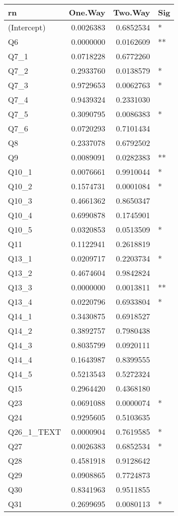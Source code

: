 \documentclass[12pt,]{article}
\begin{document}
\begin{tabular}{l|r|r|l}
\hline
rn & One.Way & Two.Way & Sig\\
\hline
(Intercept) & 0.0026383 & 0.6852534 & *\\
\hline
Q6 & 0.0000000 & 0.0162609 & **\\
\hline
Q7\_1 & 0.0718228 & 0.6772260 & \\
\hline
Q7\_2 & 0.2933760 & 0.0138579 & *\\
\hline
Q7\_3 & 0.9729653 & 0.0062763 & *\\
\hline
Q7\_4 & 0.9439324 & 0.2331030 & \\
\hline
Q7\_5 & 0.3090795 & 0.0086383 & *\\
\hline
Q7\_6 & 0.0720293 & 0.7101434 & \\
\hline
Q8 & 0.2337078 & 0.6792502 & \\
\hline
Q9 & 0.0089091 & 0.0282383 & **\\
\hline
Q10\_1 & 0.0076661 & 0.9910044 & *\\
\hline
Q10\_2 & 0.1574731 & 0.0001084 & *\\
\hline
Q10\_3 & 0.4661362 & 0.8650347 & \\
\hline
Q10\_4 & 0.6990878 & 0.1745901 & \\
\hline
Q10\_5 & 0.0320853 & 0.0513509 & *\\
\hline
Q11 & 0.1122941 & 0.2618819 & \\
\hline
Q13\_1 & 0.0209717 & 0.2203734 & *\\
\hline
Q13\_2 & 0.4674604 & 0.9842824 & \\
\hline
Q13\_3 & 0.0000000 & 0.0013811 & **\\
\hline
Q13\_4 & 0.0220796 & 0.6933804 & *\\
\hline
Q14\_1 & 0.3430875 & 0.6918527 & \\
\hline
Q14\_2 & 0.3892757 & 0.7980438 & \\
\hline
Q14\_3 & 0.8035799 & 0.0920111 & \\
\hline
Q14\_4 & 0.1643987 & 0.8399555 & \\
\hline
Q14\_5 & 0.5213543 & 0.5272324 & \\
\hline
Q15 & 0.2964420 & 0.4368180 & \\
\hline
Q23 & 0.0691088 & 0.0000074 & *\\
\hline
Q24 & 0.9295605 & 0.5103635 & \\
\hline
Q26\_1\_TEXT & 0.0000904 & 0.7619585 & *\\
\hline
Q27 & 0.0026383 & 0.6852534 & *\\
\hline
Q28 & 0.4581918 & 0.9128642 & \\
\hline
Q29 & 0.0908865 & 0.7724873 & \\
\hline
Q30 & 0.8341963 & 0.9511855 & \\
\hline
Q31 & 0.2699695 & 0.0080113 & *\\
\hline
\end{tabular}
\end{document}

